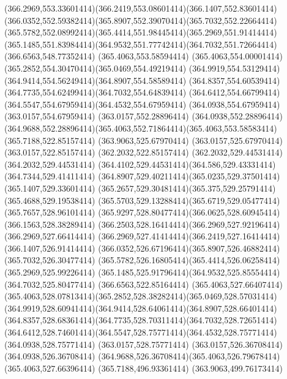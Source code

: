{{	\curveto(366.2969,553.33601414)(366.2419,553.08601414)(366.1407,552.83601414)
	\curveto(366.0352,552.59382414)(365.8907,552.39070414)(365.7032,552.22664414)
	\curveto(365.5782,552.08992414)(365.4414,551.98445414)(365.2969,551.91414414)
	\curveto(365.1485,551.83984414)(364.9532,551.77742414)(364.7032,551.72664414)
	\lineto(366.6563,548.77352414)
	\closepath
	\moveto(365.4063,553.58594414)
	\curveto(365.4063,554.00001414)(365.2852,554.30470414)(365.0469,554.49219414)
	\curveto(364.9919,554.53129414)(364.9414,554.56249414)(364.8907,554.58589414)
	\curveto(364.8357,554.60539414)(364.7735,554.62499414)(364.7032,554.64839414)
	\curveto(364.6412,554.66799414)(364.5547,554.67959414)(364.4532,554.67959414)
	\lineto(364.0938,554.67959414)
	\lineto(363.0157,554.67959414)
	\lineto(363.0157,552.28896414)
	\lineto(364.0938,552.28896414)
	\curveto(364.9688,552.28896414)(365.4063,552.71864414)(365.4063,553.58583414)
	\closepath
	\moveto(365.7188,522.85157414)
	\lineto(363.9063,525.67970414)
	\lineto(363.0157,525.67970414)
	\lineto(363.0157,522.85157414)
	\lineto(362.2032,522.85157414)
	\lineto(362.2032,529.44531414)
	\lineto(364.2032,529.44531414)
	\curveto(364.4102,529.44531414)(364.586,529.43331414)(364.7344,529.41411414)
	\curveto(364.8907,529.40211414)(365.0235,529.37501414)(365.1407,529.33601414)
	\curveto(365.2657,529.30481414)(365.375,529.25791414)(365.4688,529.19538414)
	\curveto(365.5703,529.13288414)(365.6719,529.05477414)(365.7657,528.96101414)
	\curveto(365.9297,528.80477414)(366.0625,528.60945414)(366.1563,528.38289414)
	\curveto(366.2503,528.16414414)(366.2969,527.92196414)(366.2969,527.66414414)
	\curveto(366.2969,527.41414414)(366.2419,527.16414414)(366.1407,526.91414414)
	\curveto(366.0352,526.67196414)(365.8907,526.46882414)(365.7032,526.30477414)
	\curveto(365.5782,526.16805414)(365.4414,526.06258414)(365.2969,525.99226414)
	\curveto(365.1485,525.91796414)(364.9532,525.85554414)(364.7032,525.80477414)
	\lineto(366.6563,522.85164414)
	\closepath
	\moveto(365.4063,527.66407414)
	\curveto(365.4063,528.07813414)(365.2852,528.38282414)(365.0469,528.57031414)
	\curveto(364.9919,528.60941414)(364.9414,528.64061414)(364.8907,528.66401414)
	\curveto(364.8357,528.68361414)(364.7735,528.70311414)(364.7032,528.72651414)
	\curveto(364.6412,528.74601414)(364.5547,528.75771414)(364.4532,528.75771414)
	\lineto(364.0938,528.75771414)
	\lineto(363.0157,528.75771414)
	\lineto(363.0157,526.36708414)
	\lineto(364.0938,526.36708414)
	\curveto(364.9688,526.36708414)(365.4063,526.79678414)(365.4063,527.66396414)
	\closepath
	\moveto(365.7188,496.93361414)
	\lineto(363.9063,499.76173414)
}}
